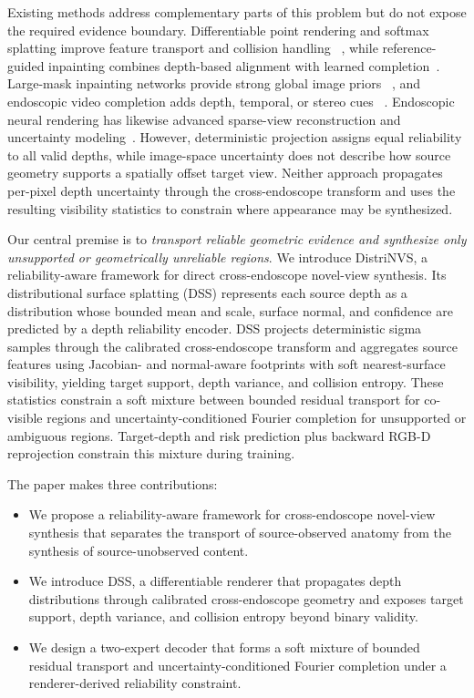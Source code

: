 \documentclass[letterpaper,10pt,conference]{ieeeconf}
\begin{document}
Existing methods address complementary parts of this problem but do not expose
the required evidence boundary. Differentiable point rendering and softmax
splatting improve feature transport and collision handling
~\cite{wiles2020synsin,niklaus2020softmax}, while reference-guided inpainting
combines depth-based alignment with learned completion~\cite{zhao2023geofill}.
Large-mask inpainting networks provide strong global image priors
~\cite{suvorov2022lama,chu2023uffc}, and endoscopic video completion adds
depth, temporal, or stereo cues
~\cite{daher2023temporal,zhang2024daevi,zou2025ssifnet}. Endoscopic neural
rendering has likewise advanced sparse-view reconstruction and uncertainty
modeling~\cite{li2024endosparse,guo2025ucnerf}. However, deterministic
projection assigns equal reliability to all valid depths, while image-space
uncertainty does not describe how source geometry
supports a spatially offset target view. Neither approach propagates per-pixel
depth uncertainty through the cross-endoscope transform and uses the resulting
visibility statistics to constrain where appearance may be synthesized.

Our central premise is to \emph{transport reliable geometric evidence and
synthesize only unsupported or geometrically unreliable regions}. We introduce
DistriNVS, a reliability-aware framework
for direct cross-endoscope novel-view synthesis. Its distributional surface
splatting (DSS) represents each source depth as a distribution whose bounded
mean and scale, surface normal, and confidence are predicted by a depth
reliability encoder. DSS projects deterministic sigma samples through the
calibrated cross-endoscope transform and aggregates source features using
Jacobian- and normal-aware footprints with soft nearest-surface visibility,
yielding target support, depth variance, and collision entropy. These statistics
constrain a soft mixture between bounded residual transport for co-visible
regions and uncertainty-conditioned Fourier completion for unsupported or
ambiguous regions. Target-depth and risk prediction plus backward RGB-D
reprojection constrain this mixture during training.

The paper makes three contributions:
\begin{itemize}
    \item We propose a reliability-aware framework for cross-endoscope novel-view 
    synthesis that separates the transport of source-observed anatomy from the 
    synthesis of source-unobserved content.
    \item We introduce DSS, a differentiable renderer that propagates depth
    distributions through calibrated cross-endoscope geometry and exposes
    target support, depth variance, and collision entropy beyond binary validity.
    \item We design a two-expert decoder that forms a soft mixture of bounded
    residual transport and uncertainty-conditioned Fourier completion under a
    renderer-derived reliability constraint.
\end{itemize}
\end{document}

